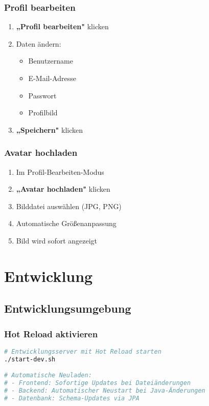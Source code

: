 \documentclass[a4paper,12pt]{article}
\begin{document}
\subsubsection{Profil bearbeiten}
\begin{enumerate}
    \item \textbf{„Profil bearbeiten"} klicken
    \item Daten ändern:
    \begin{itemize}
        \item Benutzername
        \item E-Mail-Adresse
        \item Passwort
        \item Profilbild
    \end{itemize}
    \item \textbf{„Speichern"} klicken
\end{enumerate}

\subsubsection{Avatar hochladen}
\begin{enumerate}
    \item Im Profil-Bearbeiten-Modus
    \item \textbf{„Avatar hochladen"} klicken
    \item Bilddatei auswählen (JPG, PNG)
    \item Automatische Größenanpassung
    \item Bild wird sofort angezeigt
\end{enumerate}

\section{Entwicklung}

\subsection{Entwicklungsumgebung}

\subsubsection{Hot Reload aktivieren}
\begin{lstlisting}[language=bash]
# Entwicklungsserver mit Hot Reload starten
./start-dev.sh

# Automatische Neuladen:
# - Frontend: Sofortige Updates bei Dateiänderungen
# - Backend: Automatischer Neustart bei Java-Änderungen
# - Datenbank: Schema-Updates via JPA
\end{lstlisting}
\end{document}
